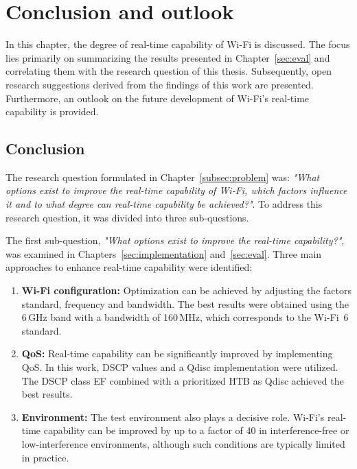 \chapter{Conclusion and outlook}\label{sec:conc}
In this chapter, the degree of real-time capability of Wi-Fi is discussed.  
The focus lies primarily on summarizing the results presented in Chapter~\ref{sec:eval} and correlating them with the research question of this thesis.  
Subsequently, open research suggestions derived from the findings of this work are presented.  
Furthermore, an outlook on the future development of Wi-Fi's real-time capability is provided.  

\section{Conclusion}
The research question formulated in Chapter~\ref{subsec:problem} was:
\textit{"What options exist to improve the real-time capability of Wi-Fi, which factors influence it and to what degree can real-time capability be achieved?"}.  
To address this research question, it was divided into three sub-questions.  

The first sub-question, \textit{"What options exist to improve the real-time capability?"}, was examined in Chapters~\ref{sec:implementation} and~\ref{sec:eval}.  
Three main approaches to enhance real-time capability were identified:  
\begin{enumerate}
    \item \textbf{Wi-Fi configuration:}  
    Optimization can be achieved by adjusting the factors standard, frequency and bandwidth.  
    The best results were obtained using the 6\,GHz band with a bandwidth of 160\,MHz, which corresponds to the Wi-Fi~6 standard.  

    \item \textbf{\ac{QoS}:}  
    Real-time capability can be significantly improved by implementing \ac{QoS}.  
    In this work, \ac{DSCP} values and a \ac{Qdisc} implementation were utilized.  
    The \ac{DSCP} class \ac{EF} combined with a prioritized \ac{HTB} as \ac{Qdisc} achieved the best results.  

    \item \textbf{Environment:}  
    The test environment also plays a decisive role.  
    Wi-Fi's real-time capability can be improved by up to a factor of 40 in interference-free or low-interference environments, although such conditions are typically limited in practice.  
\end{enumerate}

